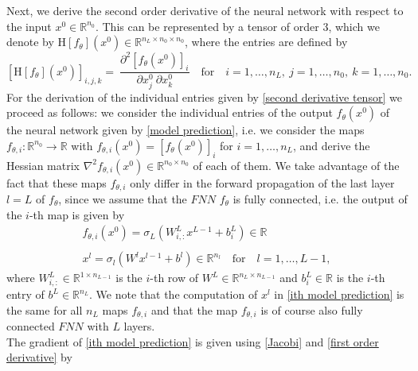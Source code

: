 Next, we derive the second order derivative of the neural network with respect to the input $x^0 \in \mathbb{R}^{n_0}$. This can be represented by a tensor of order $3$, which we denote by $\mathrm{H} \left[f_{\theta} \right]\left(x^0\right) \in \mathbb{R}^{n_L \times n_0 \times n_0}$, where the entries are defined by
\begin{equation}
    \label{second derivative tensor}
    \left[ \mathrm{H} \left[f_{\theta} \right]\left(x^0\right) \right]_{i,j,k} =\ \frac{\partial^2 \left[f_{\theta}\left(x^0\right)\right]_i}{\partial x^0_{j} \ \partial x^0_{k}} \quad \text{for} \quad i = 1,\ldots, n_L, \ j = 1,\ldots, n_0, \ k = 1,\ldots, n_0.
\end{equation}
For the derivation of the individual entries given by \cref{second derivative tensor} we proceed as follows: we consider the individual entries of the output $f_{\theta}\left(x^0\right)$ of the neural network given by \cref{model prediction}, i.e. we consider the maps $f_{\theta, i} \colon \mathbb{R}^{n_0} \to \mathbb{R}$ with $f_{\theta, i} \left( x^0 \right) = \left[ f_{\theta} (x^0) \right]_i$ for $i = 1, \ldots, n_L$, and derive the Hessian matrix $\nabla^2 f_{\theta, i} \left( x^0 \right) \in \mathbb{R}^{n_0 \times n_0}$ of each of them. We take advantage of the fact that these maps $f_{\theta, i}$ only differ in the forward propagation of the last layer $l = L$ of $f_{\theta}$, since we assume that the $FNN$ $f_{\theta}$ is fully connected, i.e. the output of the $i$-th map is given by 
\begin{equation} 
    \label{ith model prediction}
    \begin{gathered}
        f_{\theta, i} (x^0) = \sigma_L\left(W^L_{i,:} x^{L-1}  + b^{L}_{i} \right) \in \mathbb{R} \\
        \\
        x^l = \sigma_l\left(W^l x^{l-1} + b^l\right) \in \mathbb{R}^{n_l} \quad \text{for} \quad l = 1, \ldots, L-1,
    \end{gathered} 
\end{equation} 
where $W^L_{i,:} \in \mathbb{R}^{1 \times n_{L-1}}$ is the $i$-th row of $W^L \in \mathbb{R}^{n_L \times n_{L-1}}$ and $b^{L}_{i} \in \mathbb{R}$ is the $i$-th entry of $b^{L} \in \mathbb{R}^{n_L}$. We note that the computation of $x^l$ in \cref{ith model prediction} is the same for all $n_L$ maps $f_{\theta, i}$ and that the map $f_{\theta, i}$ is of course also fully connected $FNN$ with $L$ layers. \\
The gradient of \cref{ith model prediction} is given using \cref{Jacobi} and \cref{first order derivative} by
